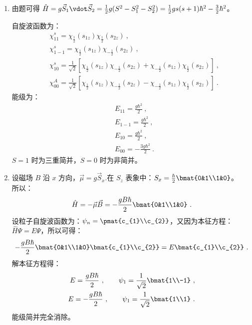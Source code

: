 \subsection{ }
\begin{enumerate}
\item 由题可得 $\hat{H} = g \vec{S}_{1}\vdot \vec{S}_{2} = \frac{1}{2}g(S^{2}-S^{2}_{1}-S^{2}_{2}) = \frac{1}{2}gs(s+1)\hbar^{2}-\frac{3}{2}\hbar^2 $。

自旋波函数为：
\begin{align}
& \chi^{s}_{11} = \chi_{\frac{1}{2}}(s_{1z})\chi_{\frac{1}{2}}(s_{2z})~, \\
& \chi^{s}_{1-1} = \chi_{\frac{1}{2}}(s_{1z})\chi_{-\frac{1}{2}}(s_{2z})~, \\
&\chi^{s}_{10} = \frac{1}{\sqrt{2}} \left[ \chi_{\frac{1}{2}}(s_{1z})\chi_{-\frac{1}{2}}(s_{2z}) + \chi_{-\frac{1}{2}}(s_{1z})\chi_{\frac{1}{2}}(s_{2z})  \right]~, \\
&\chi^{A}_{00} = \frac{1}{\sqrt{2}} \left[ \chi_{\frac{1}{2}}(s_{1z})\chi_{-\frac{1}{2}}(s_{2z}) - \chi_{-\frac{1}{2}}(s_{1z})\chi_{\frac{1}{2}}(s_{2z})  \right]~.
\end{align}
能级为：
\begin{align}
&E_{11} =\frac{g\hbar^{2}}{2}~,  \\
&E_{1-1} =\frac{g\hbar^{2}}{2} ~, \\
&E_{10} =\frac{g\hbar^{2}}{2}  ~,\\
&E_{00} =-\frac{3g\hbar^{2}}{2}  ~.
\end{align}
$S=1$ 时为三重简并，$S=0$ 时为非简并。
\item 设磁场 $B$ 沿 $x$ 方向，$\vec{\mu} = g \vec{S}_{x} $.在 $S_{z}$ 表象中：$S_{x} = \frac{\hbar}{2} \bmat{0&1\\1&0}$。\\
所以：
\begin{equation}
\hat{H} = -\vec{\mu}\vec{B} = -\frac{gB\hbar}{2} \bmat{0&1\\1&0}~.
\end{equation}
设粒子自旋波函数为：$\psi_{n} = \pmat{c_{1}\\c_{2}} $，又因为本征方程：$\hat{H}\Psi = E\Psi $，所以可得：\\
\begin{equation}
-\frac{gB\hbar}{2} \bmat{0&1\\1&0}\bmat{c_{1}\\c_{2}} = E\bmat{c_{1}\\c_{2}}~.
\end{equation}
解本征方程得：
\begin{align}
E = \frac{gB\hbar}{2} ~,\qquad \psi_{1} = \frac{1}{\sqrt{2}} \bmat{1\\-1} ~,\\
E =  -\frac{gB\hbar}{2}~, \qquad \psi_{1} = \frac{1}{\sqrt{2}} \bmat{1\\1}~.
\end{align}
能级简并完全消除。
\end{enumerate}


